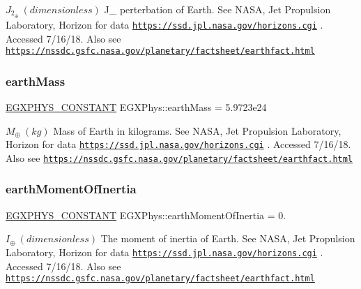 $ J_{2}_{\oplus} \ (dimensionless)$ J\+\_ perterbation of Earth. See N\+A\+SA, Jet Propulsion Laboratory, Horizon for data \href{https://ssd.jpl.nasa.gov/horizons.cgi}{\tt https\+://ssd.\+jpl.\+nasa.\+gov/horizons.\+cgi} . Accessed 7/16/18. Also see \href{https://nssdc.gsfc.nasa.gov/planetary/factsheet/earthfact.html}{\tt https\+://nssdc.\+gsfc.\+nasa.\+gov/planetary/factsheet/earthfact.\+html} \mbox{\label{group___e_g_x_phys-_constants-_astrophysics-_solar_system-_earth-_bulk_ga7d335a700fce4dda5baa19d2b2ed14ba}} 
\subsubsection{\texorpdfstring{earth\+Mass}{earthMass}}
{\footnotesize\ttfamily \mbox{\hyperlink{group___e_g_x_phys-_constants-_macros_ga76980d288494ce1714c9ac68a95ba702}{E\+G\+X\+P\+H\+Y\+S\+\_\+\+C\+O\+N\+S\+T\+A\+NT}} E\+G\+X\+Phys\+::earth\+Mass = 5.\+9723e24}

$M_{\oplus} \ (kg)$ Mass of Earth in kilograms. See N\+A\+SA, Jet Propulsion Laboratory, Horizon for data \href{https://ssd.jpl.nasa.gov/horizons.cgi}{\tt https\+://ssd.\+jpl.\+nasa.\+gov/horizons.\+cgi} . Accessed 7/16/18. Also see \href{https://nssdc.gsfc.nasa.gov/planetary/factsheet/earthfact.html}{\tt https\+://nssdc.\+gsfc.\+nasa.\+gov/planetary/factsheet/earthfact.\+html} \mbox{\label{group___e_g_x_phys-_constants-_astrophysics-_solar_system-_earth-_bulk_ga4b3a512e9d562530710100f65695ab13}} 
\subsubsection{\texorpdfstring{earth\+Moment\+Of\+Inertia}{earthMomentOfInertia}}
{\footnotesize\ttfamily \mbox{\hyperlink{group___e_g_x_phys-_constants-_macros_ga76980d288494ce1714c9ac68a95ba702}{E\+G\+X\+P\+H\+Y\+S\+\_\+\+C\+O\+N\+S\+T\+A\+NT}} E\+G\+X\+Phys\+::earth\+Moment\+Of\+Inertia = 0.}

$ I_{\oplus} \ (dimensionless)$ The moment of inertia of Earth. See N\+A\+SA, Jet Propulsion Laboratory, Horizon for data \href{https://ssd.jpl.nasa.gov/horizons.cgi}{\tt https\+://ssd.\+jpl.\+nasa.\+gov/horizons.\+cgi} . Accessed 7/16/18. Also see \href{https://nssdc.gsfc.nasa.gov/planetary/factsheet/earthfact.html}{\tt https\+://nssdc.\+gsfc.\+nasa.\+gov/planetary/factsheet/earthfact.\+html} \mbox{\label{group___e_g_x_phys-_constants-_astrophysics-_solar_system-_earth-_bulk_ga44f4484850300ac8c26488514864fb47}} 
